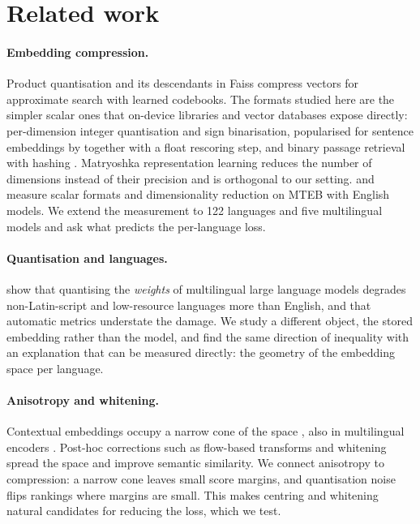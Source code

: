 \documentclass[10pt]{article}
\begin{document}
\section{Related work}
\paragraph{Embedding compression.} Product quantisation \citep{jegou2011pq} and its descendants in Faiss \citep{johnson2019faiss} compress vectors for approximate search with learned codebooks. The formats studied here are the simpler scalar ones that on-device libraries and vector databases expose directly: per-dimension integer quantisation and sign binarisation, popularised for sentence embeddings by \citet{shakir2024quant} together with a float rescoring step, and binary passage retrieval with hashing \citep{yamada2021bpr}. Matryoshka representation learning \citep{kusupati2022matryoshka} reduces the number of dimensions instead of their precision and is orthogonal to our setting. \citet{sanchez2025storage} and \citet{dimquant2026} measure scalar formats and dimensionality reduction on MTEB with English models. We extend the measurement to 122 languages and five multilingual models and ask what predicts the per-language loss.

\paragraph{Quantisation and languages.} \citet{marchisio2024quantization} show that quantising the \emph{weights} of multilingual large language models degrades non-Latin-script and low-resource languages more than English, and that automatic metrics understate the damage. We study a different object, the stored embedding rather than the model, and find the same direction of inequality with an explanation that can be measured directly: the geometry of the embedding space per language.

\paragraph{Anisotropy and whitening.} Contextual embeddings occupy a narrow cone of the space \citep{ethayarajh2019contextual,gao2019representation}, also in multilingual encoders \citep{rajaee2022isotropy}. Post-hoc corrections such as flow-based transforms \citep{li2020bertflow} and whitening \citep{su2021whitening} spread the space and improve semantic similarity. We connect anisotropy to compression: a narrow cone leaves small score margins, and quantisation noise flips rankings where margins are small. This makes centring and whitening natural candidates for reducing the loss, which we test.
\end{document}
